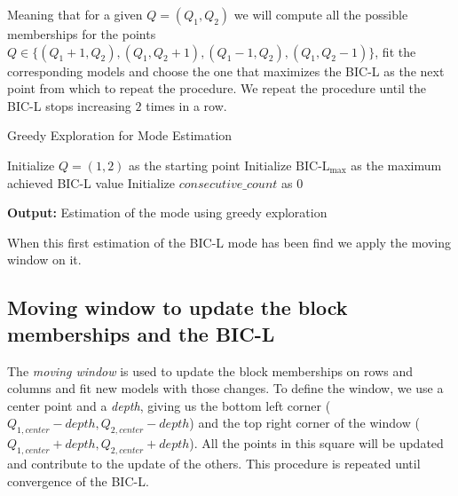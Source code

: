 \documentclass[12pt,a4paper]{report}
\begin{document}
Meaning that for a given $Q = (Q_1, Q_2)$ we will compute all the possible
memberships for the points $Q \in \{(Q_1 + 1, Q_2),(Q_1, Q_2 + 1),(Q_1 - 1, Q_2),
    (Q_1, Q_2 - 1)\}$, fit
the corresponding models and choose the one that maximizes the BIC-L as the
next point from which to repeat the procedure. We repeat the procedure until the
BIC-L stops increasing $2$ times in a row.

\begin{algorithm}[H]
    \caption{Greedy Exploration for Mode Estimation}
    \SetAlgoLined


    \BlankLine
    Initialize $Q = (1,2)$ as the starting point
    Initialize $\text{BIC-L}_{\text{max}}$ as the maximum achieved BIC-L value
    Initialize $consecutive\_count$ as 0

    \BlankLine

    \BlankLine
    \textbf{Output:} Estimation of the mode using greedy exploration
\end{algorithm}

When this first estimation of the BIC-L mode has been find we apply the moving
window on it.
\subsection{Moving window to update the block memberships and the BIC-L}
\label{ssec:moving-window-to-update-the-block-memberships-and-the-bic-l}
The \emph{moving window} is used to update the block memberships on rows and
columns and fit new models with those changes.
To define the window, we use a center point and a \emph{depth}, giving us the
bottom left corner ($Q_{1,center} - depth, Q_{2,center} - depth$) and the top right corner of the
window ($Q_{1,center} + depth, Q_{2,center} + depth$). All the points in this square will be
updated and contribute to the update of the others.
This procedure is repeated until convergence of the BIC-L.
\end{document}
